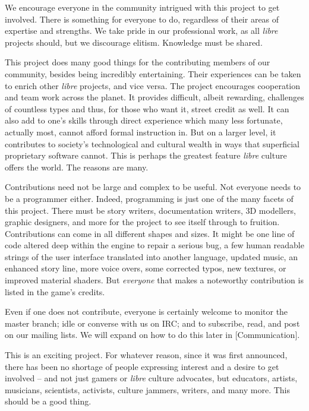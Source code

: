 
We encourage everyone in the community intrigued with this project to get involved. There is something for everyone to do, regardless of their areas of expertise and strengths. We take pride in our professional work, as all {\it libre} projects should, but we discourage elitism. Knowledge must be shared.

This project does many good things for the contributing members of our community, besides being incredibly entertaining. Their experiences can be taken to enrich other {\it libre} projects, and vice versa. The project encourages cooperation and team work across the planet. It provides difficult, albeit rewarding, challenges of countless types and thus, for those who want it, street credit as well. It can also add to one's skills through direct experience which many less fortunate, actually most, cannot afford formal instruction in. But on a larger level, it contributes to society's technological and cultural wealth in ways that superficial proprietary software cannot. This is perhaps the greatest feature {\it libre} culture offers the world. The reasons are many.

Contributions need not be large and complex to be useful. Not everyone needs to be a programmer either. Indeed, programming is just one of the many facets of this project. There must be story writers, documentation writers, 3D modellers, graphic designers, and more for the project to see itself through to fruition. Contributions can come in all different shapes and sizes. It might be one line of code altered deep within the engine to repair a serious bug, a few human readable strings of the user interface translated into another language, updated music, an enhanced story line, more voice overs, some corrected typos, new textures, or improved material shaders. But {\it everyone} that makes a noteworthy contribution is listed in the game's credits.

Even if one does not contribute, everyone is certainly welcome to monitor the master branch; idle or converse with us on IRC; and to subscribe, read, and post on our mailing lists. We will expand on how to do this later in [Communication].

This is an exciting project. For whatever reason, since it was first announced, there has been no shortage of people expressing interest and a desire to get involved -- and not just gamers or {\it libre} culture advocates, but educators, artists, musicians, scientists, activists, culture jammers, writers, and many more. This should be a good thing. 

